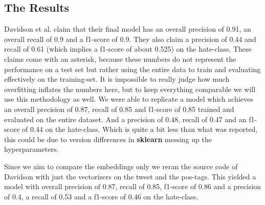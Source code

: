 \documentclass[11pt,a4paper]{article}
\begin{document}
\subsection{The Results}
Davidson et al. claim that their final model has an overall precision of 0.91, an overall recall of 0.9 and a f1-score of 0.9.
They also claim a precision of 0.44 and recall of 0.61 (which implies a f1-score of about 0.525) on the hate-class.
These claims come with an asterisk, because these numbers do not represent the performance on a test set but rather using the entire
data to train and evaluating effectively on the training-set. 
It is impossible to really judge how much overfitting inflates the numbers here, but to keep everything comparable we will use this methodology as well.
We were able to replicate a model which achieves an overall precision of 0.87, recall of 0.85 and f1-score of 0.85 
trained and evaluated on the entire dataset.
And a precision of 0.48, recall of 0.47 and an f1-score of 0.44 on the hate-class.
Which is quite a bit less than what was reported, this could be due to version differences in \textbf{sklearn} messing up the hyperparameters.

\newpage

\begin{table}
\caption{classification report for our reproduction of Davidson's model with features}


\label{tab:davidson_withfeat}
\end{table}

Since we aim to compare the embeddings only we reran the source code of Davidson with just the vectorizers on the tweet and the pos-tags.
This yielded a model with overall precision of 0.87, recall of 0.85, f1-score of 0.86
and a precision of 0.4, a recall of 0.53 and a f1-score of 0.46 on the hate-class.
\end{document}
